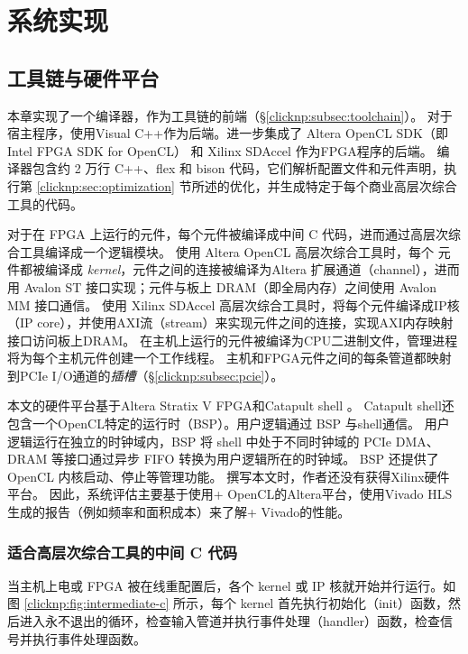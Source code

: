 \section{系统实现}
\label{clicknp:sec:impl}

\subsection{\name 工具链与硬件平台}

本章实现了一个\name 编译器，作为\name 工具链的前端（\S \ref {clicknp:subsec:toolchain}）。
对于宿主程序，使用Visual C++作为后端。进一步集成了 Altera OpenCL SDK（即 Intel FPGA SDK for OpenCL） \cite {aoc} 和 Xilinx SDAccel \cite {vivado}作为FPGA程序的后端。
\name 编译器包含约 2 万行 C++、flex 和 bison 代码，它们解析配置文件和元件声明，执行第 \ref {clicknp:sec:optimization} 节所述的优化，并生成特定于每个商业高层次综合工具的代码。

对于在 FPGA 上运行的元件，每个元件被编译成中间 C 代码，进而通过高层次综合工具编译成一个逻辑模块。
使用 Altera OpenCL 高层次综合工具时，每个 \name 元件都被编译成 \textit {kernel}，元件之间的连接被编译为Altera 扩展通道（channel），进而用 Avalon ST 接口实现；元件与板上 DRAM（即全局内存）之间使用 Avalon MM 接口通信。
使用 Xilinx SDAccel 高层次综合工具时，将每个元件编译成IP核（IP core），并使用AXI流（stream）来实现元件之间的连接，实现AXI内存映射接口访问板上DRAM。
在主机上运行的元件被编译为CPU二进制文件，管理进程将为每个主机元件创建一个工作线程。
主机和FPGA元件之间的每条管道都映射到PCIe I/O通道的\textit {插槽}（\S \ref {clicknp:subsec:pcie}）。

本文的硬件平台基于Altera Stratix V FPGA和Catapult shell \cite {putnam2014reconfigurable}。
Catapult shell还包含一个OpenCL特定的运行时（BSP）。\name 用户逻辑通过 BSP 与shell通信。
\name 用户逻辑运行在独立的时钟域内，BSP 将 shell 中处于不同时钟域的 PCIe DMA、DRAM 等接口通过异步 FIFO 转换为用户逻辑所在的时钟域。
BSP 还提供了 OpenCL 内核启动、停止等管理功能。
撰写本文时，作者还没有获得Xilinx硬件平台。
因此，系统评估主要基于使用\name + OpenCL的Altera平台，使用Vivado HLS生成的报告（例如频率和面积成本）来了解\name + Vivado的性能。


\subsubsection{适合高层次综合工具的中间 C 代码}

当主机上电或 FPGA 被在线重配置后，各个 kernel 或 IP 核就开始并行运行。如图 \ref{clicknp:fig:intermediate-c} 所示，每个 kernel 首先执行初始化（init）函数，然后进入永不退出的循环，检查输入管道并执行事件处理（handler）函数，检查信号并执行事件处理函数。

